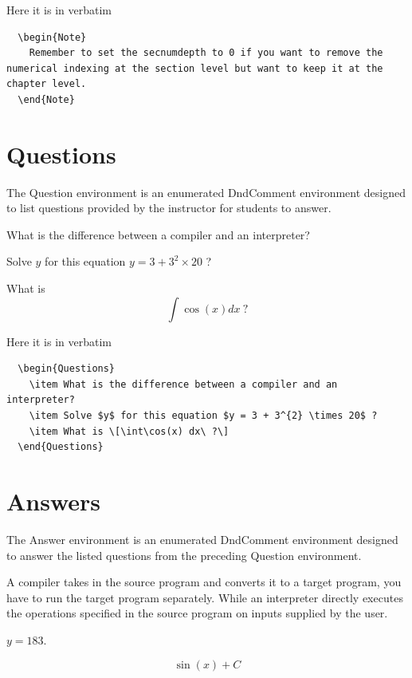 \documentclass[letterpaper,10pt,twoside,twocolumn,openany]{book}
\begin{document}
Here it is in verbatim
\begin{verbatim}
  \begin{Note}
    Remember to set the secnumdepth to 0 if you want to remove the numerical indexing at the section level but want to keep it at the chapter level.
  \end{Note} 
\end{verbatim}

\section{Questions}
The Question environment is an enumerated DndComment environment designed to list questions provided by the instructor for students to answer.
\begin{Questions}
\item What is the difference between a compiler and an interpreter?
\item Solve $y$ for this equation $y = 3 + 3^{2} \times 20$ ? 
\item What is \[\int\cos(x) dx\ ?\] 
\end{Questions}

Here it is in verbatim
\begin{verbatim}
  \begin{Questions}
    \item What is the difference between a compiler and an interpreter?
    \item Solve $y$ for this equation $y = 3 + 3^{2} \times 20$ ? 
    \item What is \[\int\cos(x) dx\ ?\] 
  \end{Questions}
\end{verbatim}

\section{Answers}
The Answer environment is an enumerated DndComment environment designed to answer the listed questions from the preceding Question environment. 
\begin{Answers}
\item A compiler takes in the source program and converts it to a target program, you have to run the target program separately. While an interpreter directly executes the operations specified in the source program on inputs supplied by the user. 
\item $y = 183$. 
\item \[\sin{\left(x \right)} + C \]
\end{Answers}
\end{document}
